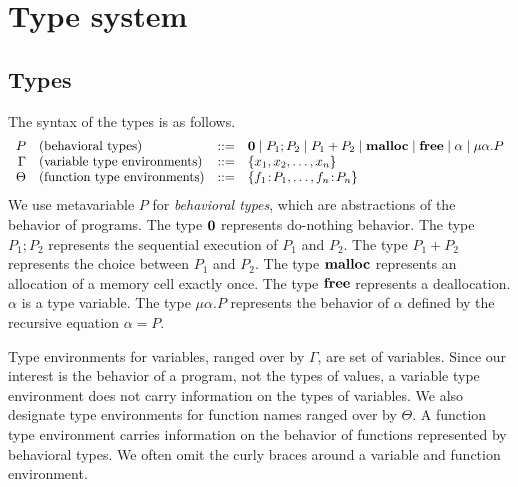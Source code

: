 
\section{Type system}
\label{sec:typesystem}

\subsection{Types}

The syntax of the types is as follows.
\[
\begin{array}{rlcl}
  P & (\mbox{behavioral types})&::=& {\bf 0} \;|\; P_{1};P_{2} \;|\; P_{1}+P_{2} \;|\; \mathbf{malloc} \;|\; \mathbf{free} \;|\; \alpha \;|\; \mu\alpha.P \\
  \Gamma & (\mbox{variable type environments}) &::=& \{x_1, x_2, \dots, x_n\}\\
  \Theta & (\mbox{function type environments}) &::=& \{f_1\!:\! P_1,\dots,f_n\!:\! P_n\}\\
\end{array}
\]
We use metavariable \(P\) for \emph{behavioral types}, which are
abstractions of the behavior of programs.  The type ${\bf 0}$
represents do-nothing behavior.  The type \(P_1;P_2\) represents the
sequential execution of \(P_1\) and \(P_2\).  The type \(P_1 + P_2\)
represents the choice between \(P_1\) and \(P_2\).  The type
\(\mathbf{malloc}\) represents an allocation of a memory cell exactly once.  The
type \(\mathbf{free}\) represents a deallocation.  \(\alpha\) is a type
variable. The type \(\mu \alpha.P\) represents the behavior of
\(\alpha\) defined by the recursive equation \(\alpha = P\).

Type environments for variables, ranged over by \(\Gamma\), are set of
variables.  Since our interest is the behavior of a program, not the
types of values, a variable type environment does not carry
information on the types of variables.  We also designate type
environments for function names ranged over by \(\Theta\).  A function
type environment carries information on the behavior of functions
represented by behavioral types.  We often omit the curly braces
around a variable and function environment.



